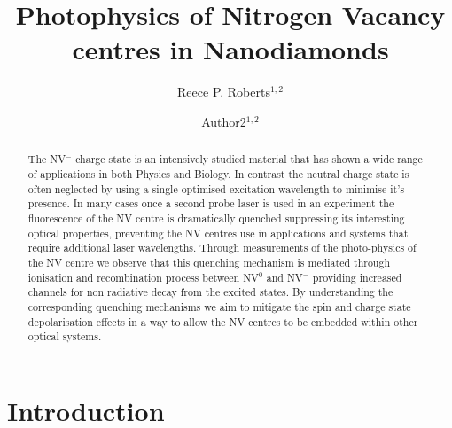 \documentclass[prl]{revtex4}
\begin{document}
\title{Photophysics of Nitrogen Vacancy centres in Nanodiamonds}
  
\author{Reece P. Roberts$^{1,2}$}
\author{Author2$^{1,2}$}



\begin{abstract}
The NV$^-$ charge state is an intensively studied material that has shown a wide range of applications in both Physics and Biology. In contrast the neutral charge state is often neglected by using a single optimised excitation wavelength to minimise it's presence. In many cases once a second probe laser is used in an experiment the fluorescence of the NV centre is dramatically quenched suppressing its interesting optical properties, preventing the NV centres use in applications and systems that require additional laser wavelengths. Through measurements of the photo-physics of the NV centre we observe that this quenching mechanism is mediated through ionisation and recombination process between NV$^0$ and NV$^-$ providing increased channels for non radiative decay from the excited states. By understanding the corresponding quenching mechanisms we aim to mitigate the spin and charge state depolarisation effects in a way to allow the NV centres to be embedded within other optical systems.
\end{abstract}

\maketitle

\section{Introduction}
\end{document}
